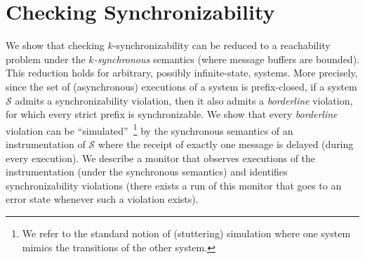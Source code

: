 \section{Checking Synchronizability}\label{sec:verif}

We show that checking $k$-synchronizability can be reduced 
to a reachability problem  
under the \emph{$k$-synchronous} semantics 
(where message buffers are bounded). This reduction holds for arbitrary, possibly infinite-state, systems.
More precisely, since the set of (asynchronous) executions of a system is prefix-closed, if a system $\mathcal{S}$ admits a synchronizability violation, then it also admits a \emph{borderline} violation, for which every strict prefix is synchronizable. We show that every \emph{borderline} violation can be ``simulated''~\footnote{We refer to the standard notion of (stuttering) simulation where one system mimics the transitions of the other system.} by the synchronous semantics of an instrumentation of $\mathcal{S}$ where the receipt of exactly one message is delayed (during every execution). 
We describe a monitor that observes executions of the instrumentation (under the synchronous semantics) and identifies synchronizability violations
(there exists a run of this monitor that goes to an error state whenever such a violation exists). %

